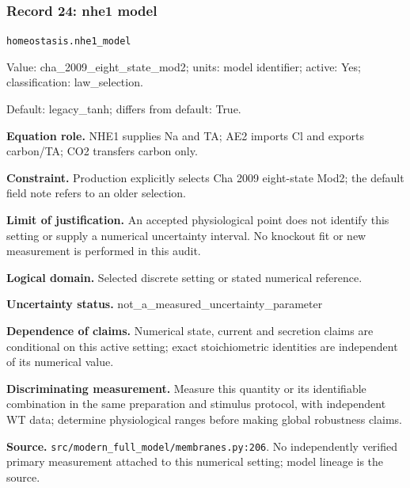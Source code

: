\subsubsection*{Record 24: nhe1 model}
{\small \nolinkurl{homeostasis.nhe1_model}\par

Value: cha\_2009\_eight\_state\_mod2; units: model identifier; active: Yes; classification: law\_selection.\par

Default: legacy\_tanh; differs from default: True.\par

\textbf{Equation role.} NHE1 supplies Na and TA; AE2 imports Cl and exports carbon/TA; CO2 transfers carbon only.\par

\textbf{Constraint.} Production explicitly selects Cha 2009 eight-state Mod2; the default field note refers to an older selection.\par

\textbf{Limit of justification.} An accepted physiological point does not identify this setting or supply a numerical uncertainty interval. No knockout fit or new measurement is performed in this audit.\par

\textbf{Logical domain.} Selected discrete setting or stated numerical reference.\par

\textbf{Uncertainty status.} not\_a\_measured\_uncertainty\_parameter\par

\textbf{Dependence of claims.} Numerical state, current and secretion claims are conditional on this active setting; exact stoichiometric identities are independent of its numerical value.\par

\textbf{Discriminating measurement.} Measure this quantity or its identifiable combination in the same preparation and stimulus protocol, with independent WT data; determine physiological ranges before making global robustness claims.\par

\textbf{Source.} \nolinkurl{src/modern_full_model/membranes.py:206}. No independently verified primary measurement attached to this numerical setting; model lineage is the source.\par}

